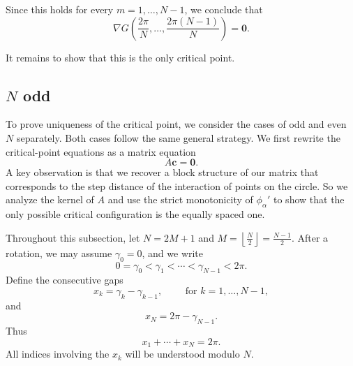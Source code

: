 \documentclass{article}
\begin{document}
Since this holds for every $m=1,\dots,N-1$, we conclude that
\[\nabla G\left(
\frac{2\pi}{N},\dots,\frac{2\pi(N-1)}{N}
\right)=\mathbf 0.\]

It remains to show that this is the only critical point.

\subsection{$N$ odd}
To prove uniqueness of the critical point, we consider the cases of odd and even $N$ separately. Both cases follow the same general strategy. We first rewrite the critical-point equations as a matrix equation
\[
A\mathbf{c}=\mathbf{0}.
\]
A key observation is that we recover a block structure of our matrix that corresponds to the step distance of the interaction of points on the circle. So we analyze the kernel of $A$ and use the strict monotonicity of $\phi_\alpha'$ to show that the only possible critical configuration is the equally spaced one.

Throughout this subsection, let
$N=2M+1$ and $M=\left\lfloor \frac{N}{2}\right\rfloor=\frac{N-1}{2}.$
After a rotation, we may assume $\gamma_0=0$, and we write
\[
0=\gamma_0<\gamma_1<\cdots<\gamma_{N-1}<2\pi.
\]
Define the consecutive gaps
\[
x_k=\gamma_k-\gamma_{k-1},
\qquad\text{ for } k=1,\dots,N-1,
\]
and
\[
x_N=2\pi-\gamma_{N-1}.
\]
Thus
\[
x_1+\cdots+x_N=2\pi.
\]
All indices involving the $x_k$ will be understood modulo $N$.
\end{document}
